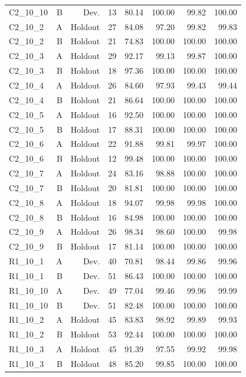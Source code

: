 \begin{longtable}{@{}lrrrrrrr@{}}
C2\_10\_10 & B & Dev. & 13 & 80.14 & 100.00 & 99.82 & 100.00 \\
C2\_10\_2 & A & Holdout & 27 & 84.08 & 97.20 & 99.82 & 99.83 \\
C2\_10\_2 & B & Holdout & 21 & 74.83 & 100.00 & 100.00 & 100.00 \\
C2\_10\_3 & A & Holdout & 29 & 92.17 & 99.13 & 99.87 & 100.00 \\
C2\_10\_3 & B & Holdout & 18 & 97.36 & 100.00 & 100.00 & 100.00 \\
C2\_10\_4 & A & Holdout & 26 & 84.60 & 97.93 & 99.43 & 99.44 \\
C2\_10\_4 & B & Holdout & 21 & 86.64 & 100.00 & 100.00 & 100.00 \\
C2\_10\_5 & A & Holdout & 16 & 92.50 & 100.00 & 100.00 & 100.00 \\
C2\_10\_5 & B & Holdout & 17 & 88.31 & 100.00 & 100.00 & 100.00 \\
C2\_10\_6 & A & Holdout & 22 & 91.88 & 99.81 & 99.97 & 100.00 \\
C2\_10\_6 & B & Holdout & 12 & 99.48 & 100.00 & 100.00 & 100.00 \\
C2\_10\_7 & A & Holdout & 24 & 83.16 & 98.88 & 100.00 & 100.00 \\
C2\_10\_7 & B & Holdout & 20 & 81.81 & 100.00 & 100.00 & 100.00 \\
C2\_10\_8 & A & Holdout & 18 & 94.07 & 99.98 & 99.98 & 100.00 \\
C2\_10\_8 & B & Holdout & 16 & 84.98 & 100.00 & 100.00 & 100.00 \\
C2\_10\_9 & A & Holdout & 26 & 98.34 & 98.60 & 100.00 & 99.98 \\
C2\_10\_9 & B & Holdout & 17 & 81.14 & 100.00 & 100.00 & 100.00 \\
R1\_10\_1 & A & Dev. & 40 & 70.81 & 98.44 & 99.86 & 99.96 \\
R1\_10\_1 & B & Dev. & 51 & 86.43 & 100.00 & 100.00 & 100.00 \\
R1\_10\_10 & A & Dev. & 49 & 77.04 & 99.46 & 99.96 & 99.99 \\
R1\_10\_10 & B & Dev. & 51 & 82.48 & 100.00 & 100.00 & 100.00 \\
R1\_10\_2 & A & Holdout & 45 & 83.83 & 98.92 & 99.89 & 99.93 \\
R1\_10\_2 & B & Holdout & 53 & 92.44 & 100.00 & 100.00 & 100.00 \\
R1\_10\_3 & A & Holdout & 45 & 91.39 & 97.55 & 99.92 & 99.98 \\
R1\_10\_3 & B & Holdout & 48 & 85.20 & 99.85 & 100.00 & 100.00 \\

\end{longtable}
